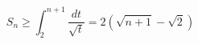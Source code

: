 \begin{displaymath}
 S_n\geq \int_{2}^{n+1}\frac{dt}{\sqrt{t}} =2(\sqrt{n+1}-\sqrt{2}) 
\end{displaymath}
